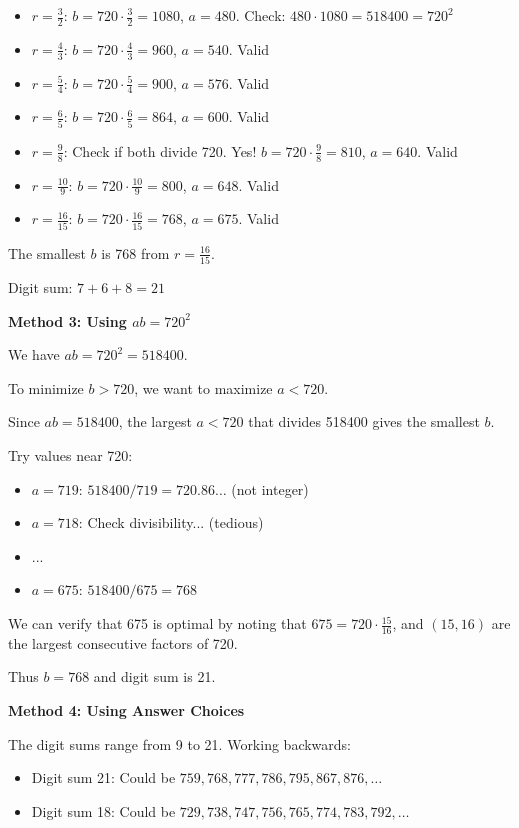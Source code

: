 \documentclass[11pt]{article}
\begin{document}
\begin{solutionbox}
\begin{itemize}
    \item $r = \frac{3}{2}$: $b = 720 \cdot \frac{3}{2} = 1080$, $a = 480$. Check: $480 \cdot 1080 = 518400 = 720^2$ \checkmark
    \item $r = \frac{4}{3}$: $b = 720 \cdot \frac{4}{3} = 960$, $a = 540$. Valid \checkmark
    \item $r = \frac{5}{4}$: $b = 720 \cdot \frac{5}{4} = 900$, $a = 576$. Valid \checkmark
    \item $r = \frac{6}{5}$: $b = 720 \cdot \frac{6}{5} = 864$, $a = 600$. Valid \checkmark
    \item $r = \frac{9}{8}$: Check if both divide 720. Yes! $b = 720 \cdot \frac{9}{8} = 810$, $a = 640$. Valid \checkmark
    \item $r = \frac{10}{9}$: $b = 720 \cdot \frac{10}{9} = 800$, $a = 648$. Valid \checkmark
    \item $r = \frac{16}{15}$: $b = 720 \cdot \frac{16}{15} = 768$, $a = 675$. Valid \checkmark
\end{itemize}

The smallest $b$ is 768 from $r = \frac{16}{15}$.

Digit sum: $7 + 6 + 8 = 21$

\textbf{Method 3: Using $ab = 720^2$}

We have $ab = 720^2 = 518400$.

To minimize $b > 720$, we want to maximize $a < 720$.

Since $ab = 518400$, the largest $a < 720$ that divides 518400 gives the smallest $b$.

Try values near 720:
\begin{itemize}
    \item $a = 719$: $518400 / 719 = 720.86\ldots$ (not integer)
    \item $a = 718$: Check divisibility... (tedious)
    \item ...
    \item $a = 675$: $518400 / 675 = 768$ \checkmark
\end{itemize}

We can verify that 675 is optimal by noting that $675 = 720 \cdot \frac{15}{16}$, and $(15, 16)$ are the largest consecutive factors of 720.

Thus $b = 768$ and digit sum is 21.

\textbf{Method 4: Using Answer Choices}

The digit sums range from 9 to 21. Working backwards:
\begin{itemize}
    \item Digit sum 21: Could be $759, 768, 777, 786, 795, 867, 876, \ldots$
    \item Digit sum 18: Could be $729, 738, 747, 756, 765, 774, 783, 792, \ldots$
\end{itemize}


\end{solutionbox}
\end{document}
